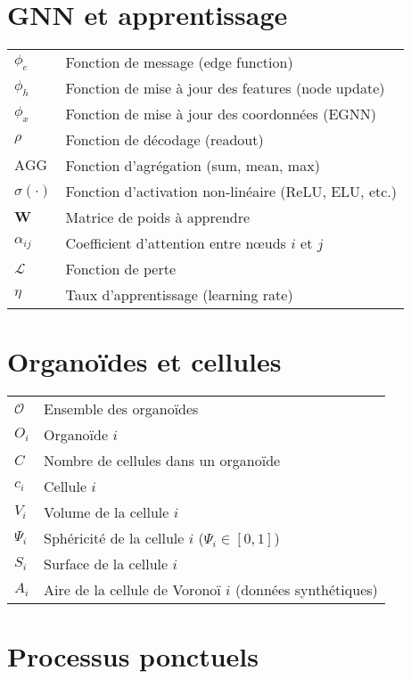 \section*{GNN et apprentissage}

\begin{tabular}{p{2.5cm} p{11cm}}
  \hline
  $\phi_e$ & Fonction de message (edge function)\\
  $\phi_h$ & Fonction de mise à jour des features (node update)\\
  $\phi_x$ & Fonction de mise à jour des coordonnées (EGNN)\\
  $\rho$ & Fonction de décodage (readout)\\
  $\text{AGG}$ & Fonction d'agrégation (sum, mean, max)\\
  $\sigma(\cdot)$ & Fonction d'activation non-linéaire (ReLU, ELU, etc.)\\
  $\mathbf{W}$ & Matrice de poids à apprendre\\
  $\alpha_{ij}$ & Coefficient d'attention entre nœuds $i$ et $j$\\
  $\mathcal{L}$ & Fonction de perte\\
  $\eta$ & Taux d'apprentissage (learning rate)\\
  \hline
\end{tabular}

\section*{Organoïdes et cellules}

\begin{tabular}{p{2.5cm} p{11cm}}
  \hline
  $\mathcal{O}$ & Ensemble des organoïdes\\
  $O_i$ & Organoïde $i$\\
  $C$ & Nombre de cellules dans un organoïde\\
  $c_i$ & Cellule $i$\\
  $V_i$ & Volume de la cellule $i$\\
  $\Psi_i$ & Sphéricité de la cellule $i$ ($\Psi_i \in [0,1]$)\\
  $S_i$ & Surface de la cellule $i$\\
  $A_i$ & Aire de la cellule de Voronoï $i$ (données synthétiques)\\
  \hline
\end{tabular}

\section*{Processus ponctuels}

